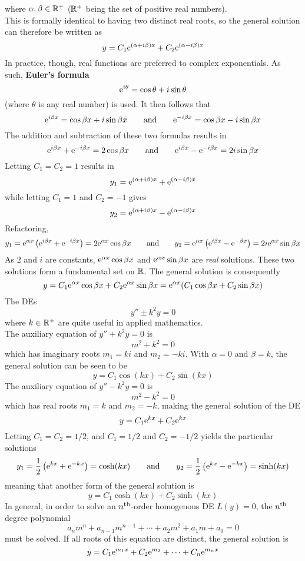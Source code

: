 \documentclass[./Differential Equations]{subfiles}
\begin{document}
					where \(\alpha, \beta \in \mathbb{R}^+\) (\(\mathbb{R}^+\) being the set of positive real numbers). \\
					This is formally identical to having two distinct real roots, so the general solution can therefore be written as
					\[y = C_1\text{e}^{(\alpha + i\beta)x} + C_2\text{e}^{(\alpha - i\beta)x}\]
					In practice, though, real functions are preferred to complex exponentials. As such, \textbf{Euler's formula}
					\[\text{e}^{i\theta} = \cos\theta + i\sin\theta\]
					(where \(\theta\) is any real number) is used. It then follows that
					\[
						\text{e}^{i\beta x} = \cos\beta x + i\sin\beta x \qquad \text{and} \qquad
								\text{e}^{-i\beta x} = \cos\beta x - i\sin\beta x
					\]
					The addition and subtraction of these two formulas results in
					\[
						\text{e}^{i\beta x} + \text{e}^{-i\beta x} = 2\cos\beta x \qquad \text{and} \qquad
								\text{e}^{i\beta x} - \text{e}^{-i\beta x} = 2i\sin \beta x	
					\]
					Letting \(C_1 = C_2 = 1\) results in
					\[
						y_1 = \text{e}^{(\alpha + i\beta)x} + \text{e}^{(\alpha - i\beta)x}
					\]
					while letting \(C_1 = 1\) and \(C_2 = -1\) gives
					\[
						y_2 = \text{e}^{(\alpha + i\beta)x} - \text{e}^{(\alpha - i\beta)x}
					\]
					Refactoring,
					\[
						y_1 = \text{e}^{\alpha x}\left(\text{e}^{i\beta x} + \text{e}^{-i\beta x}\right) = 2\text{e}^{\alpha x}\cos\beta x \qquad \text{and} \qquad
								y_2 = \text{e}^{\alpha x}\left(\text{e}^{i\beta x} - \text{e}^{-\beta x}\right) = 2i\text{e}^{\alpha x}\sin\beta x
					\]
					As \(2\) and \(i\) are constants, \(\text{e}^{\alpha x}\cos\beta x\) and \(\text{e}^{\alpha x}\sin\beta x\) are \textit{real} solutions. These two solutions form a fundamental set on \(\mathbb{R}\). The general solution is consequently
					\[
						y = C_1\text{e}^{\alpha x}\cos\beta x + C_2\text{e}^{\alpha x}\sin\beta x
							= \text{e}^{\alpha x}(C_1\cos\beta x + C_2\sin\beta x) 
					\]
				The DEs
					\[y'' \pm k^2y = 0\]
					where \(k \in \mathbb{R}^+\) are quite useful in applied mathematics. \\
				The auxiliary equation of \(y'' + k^2y = 0\) is
					\[m^2 + k^2 = 0\]
					which has imaginary roots \(m_1 = ki\) and \(m_2 = -ki\). With \(\alpha = 0\) and \(\beta = k\), the general solution can be seen to be
					\[y = C_1\cos(kx) + C_2\sin(kx)\]
				The auxiliary equation of \(y'' - k^2y = 0\) is
					\[m^2 - k^2 = 0\]
					which has real roots \(m_1 = k\) and \(m_2 = -k\), making the general solution of the DE
					\[y = C_1\text{e}^{kx} + C_2\text{e}^{kx}\]
				Letting \(C_1 = C_2 = 1/2\), and \(C_1 = 1/2\) and \(C_2 = -1/2\) yields the particular solutions
					\[
						y_1 = \frac{1}{2}\left(\text{e}^{kx} + \text{e}^{-kx}\right) = \cosh(kx) \qquad \text{and} \qquad
								y_2 = \frac{1}{2}\left(\text{e}^{kx} - \text{e}^{-kx}\right) = \sinh(kx) 
					\]
					meaning that another form of the general solution is
					\[y = C_1\cosh(kx) + C_2\sinh(kx)\]
				In general, in order to solve an \(n^{\text{th}}\)-order homogenous DE \(L(y) = 0\), the \(n^{\text{th}}\) degree polynomial
					\[a_nm^n + a_{n - 1}m^{n - 1} + \cdots + a_2m^2 + a_1m + a_0 = 0\]
					must be solved. If all roots of this equation are distinct, the general solution is
					\[y = C_1\text{e}^{m_1x} + C_2\text{e}^{m_2} + \cdots + C_n\text{e}^{m_nx}\]
\end{document}
